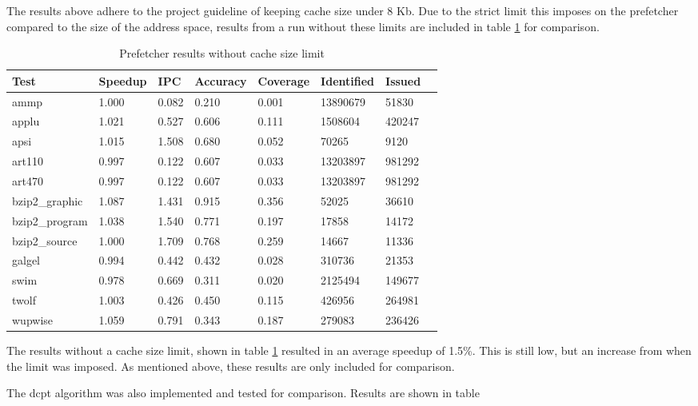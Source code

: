 The results above adhere to the project guideline of keeping cache size under 8 Kb. Due to the strict limit this imposes on the prefetcher compared to the size of the address space, results from a run without these limits are included in table \ref{table:results2} for comparison.

\begin{table}[!t]
\renewcommand{\arraystretch}{1.3}
\caption{Prefetcher results without cache size limit}
\label{table:results2}
\centering
\begin{tabular}{|l|l|l|l|l|l|l|l|}
\hline
\bfseries Test & \bfseries Speedup & \bfseries IPC & \bfseries Accuracy & \bfseries Coverage & \bfseries Identified & \bfseries Issued\\
\hline
\hline
ammp 		& 1.000  &	0.082 &	0.210 &	0.001 &	13890679 &	51830\\
applu 		& 1.021 & 	0.527 &	0.606 &	0.111 &	1508604 & 	420247\\
apsi 		& 1.015 & 	1.508 &	0.680 &	0.052 &	70265 &	9120\\	
art110 		& 0.997 & 	0.122 &	0.607 &	0.033 &	13203897 &	981292\\	
art470 		& 0.997 & 	0.122 &	0.607 &	0.033 &	13203897 &	981292\\
bzip2\_graphic 	& 1.087 & 	1.431 &	0.915 &	0.356 &	52025 &	36610\\
bzip2\_program 	& 1.038 & 	1.540 &	0.771 &	0.197 &	17858 &	14172 	\\
bzip2\_source 	& 1.000 & 	1.709 &	0.768 &	0.259 &	14667 &	11336\\
galgel 		& 0.994 & 	0.442 &	0.432 &	0.028 &	310736 & 21353\\
swim 		& 0.978 & 	0.669 &	0.311 &	0.020 &	2125494 & 	149677\\
twolf 		& 1.003 & 	0.426 &	0.450 &	0.115 &	426956 & 	264981	\\
wupwise 	& 1.059 & 	0.791 &	0.343 &	0.187 &	279083 & 	236426\\
\hline
\end{tabular}
\end{table}

The results without a cache size limit, shown in table \ref{table:results2} resulted in an average speedup of 1.5\%. This is still low, but an increase from when the limit was imposed. As mentioned above, these results are only included for comparison.

The dcpt algorithm was also implemented and tested for comparison. Results are shown in table

